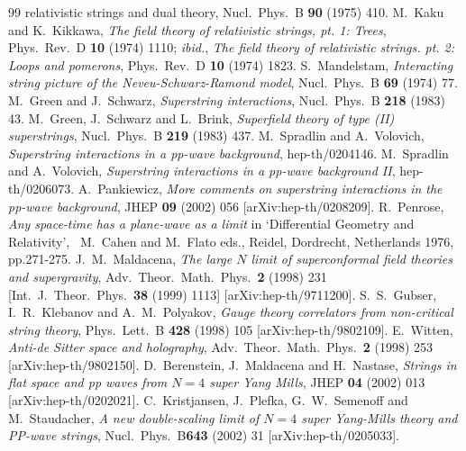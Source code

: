 \documentclass[12pt]{article}
\numberwithin{equation}{section} \setlength{\textwidth}{17cm}
\begin{document}
\begin{thebibliography}{99}
{relativistic strings and dual theory},
Nucl.\ Phys.\ B {\bf 90} (1975) 410.
 M.~Kaku and K.~Kikkawa, {\em The field theory of relativistic
strings, pt. 1: Trees},
Phys.\ Rev.\ D {\bf 10} (1974) 1110;
{\em ibid.}, {\em The field theory of relativistic strings. pt. 2: Loops
and pomerons},
Phys.\ Rev.\ D {\bf 10} (1974) 1823.
S.~Mandelstam, {\em Interacting string picture of the Neveu-Schwarz-Ramond
model},
Nucl.\ Phys.\ B {\bf 69} (1974) 77.
M.~Green and J.~Schwarz,
{\em Superstring interactions},
Nucl.~Phys.~B {\bf 218} (1983) 43.
M.~Green, J.~Schwarz and L.~Brink,
{\em Superfield theory of type (II) superstrings},
Nucl.~Phys.~B {\bf 219} (1983) 437.
M.~Spradlin and A.~Volovich,
{\em Superstring interactions in a pp-wave background}, hep-th/0204146.
M.~Spradlin and A.~Volovich,
{\em Superstring interactions in a pp-wave background II}, hep-th/0206073.
A.~Pankiewicz,
{\em More comments on superstring interactions in the pp-wave background},
JHEP {\bf 09} (2002) 056 [arXiv:hep-th/0208209].
R.~Penrose,
{\em Any space-time has a plane-wave as a limit} in `Differential Geometry
and Relativity',
~M.~Cahen and M.~Flato eds., Reidel, Dordrecht, Netherlands 1976,
pp.271-275.
J.~M.~Maldacena,
{\em The large $N$ limit of superconformal field theories and
supergravity},
Adv.\ Theor.\ Math.\ Phys.\  {\bf 2} (1998) 231
[Int.\ J.\ Theor.\ Phys.\  {\bf 38} (1999) 1113] [arXiv:hep-th/9711200].
S.~S.~Gubser, I.~R.~Klebanov and A.~M.~Polyakov,
{\em Gauge theory correlators from non-critical string theory},
Phys.\ Lett.\ B {\bf 428} (1998) 105 [arXiv:hep-th/9802109].
 E.~Witten,
{\em Anti-de Sitter space and holography},
Adv.\ Theor.\ Math.\ Phys.\  {\bf 2} (1998) 253 [arXiv:hep-th/9802150].
D.~Berenstein, J.~Maldacena and H.~Nastase,
{\em Strings in flat space and pp waves from $N=4$ super Yang Mills},
JHEP {\bf 04} (2002) 013 [arXiv:hep-th/0202021].
C.~Kristjansen, J.~Plefka, G.~W.~Semenoff and M.~Staudacher,
{\em A new double-scaling limit of $N=4$ super Yang-Mills theory and
PP-wave strings},
Nucl.~Phys.~B{\bf 643} (2002) 31 [arXiv:hep-th/0205033].

\end{thebibliography}
\end{document}
